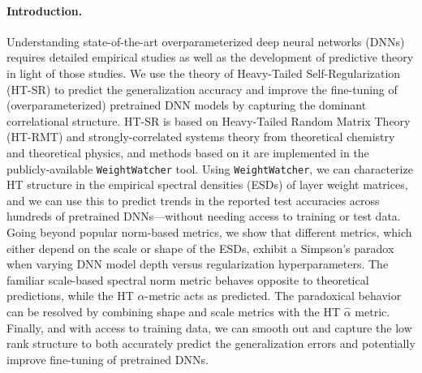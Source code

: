 \documentclass{article}
\begin{document}


\paragraph{Introduction.}

Understanding state-of-the-art overparameterized deep neural networks (DNNs) requires detailed empirical studies as well as the development of predictive theory in light of those studies. 
We use the theory of Heavy-Tailed Self-Regularization (HT-SR) to predict the generalization accuracy and improve the fine-tuning of (overparameterized) pretrained DNN models by capturing the dominant correlational structure.
HT-SR is based on Heavy-Tailed Random Matrix Theory (HT-RMT) and strongly-correlated systems theory from theoretical chemistry and theoretical physics, and methods based on it are implemented in the publicly-available \texttt{WeightWatcher} tool.
Using \texttt{WeightWatcher}, we can characterize HT structure in the empirical spectral densities (ESDs) of layer weight matrices, and we can use this to predict trends in the reported test accuracies across hundreds of pretrained DNNs---without needing access to training or test data.
Going beyond popular norm-based metrics, we show that different metrics, which either depend on the scale or shape of the ESDs, exhibit a Simpson's paradox when varying DNN model depth versus regularization hyperparameters.
The familiar scale-based spectral norm metric behaves opposite to theoretical predictions, while the HT $\alpha$-metric acts as predicted.
The paradoxical behavior  can be resolved by combining shape and scale metrics with the HT $\hat{\alpha}$ metric.
Finally, and with access to training data, we can 
smooth out and capture the low rank structure to both accurately
predict the generalization errors and potentially improve
fine-tuning of pretrained DNNs.
\end{document}
